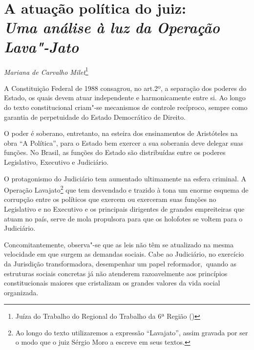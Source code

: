 \chapter*{A atuação política do juiz:\\
\emph{Uma análise à luz da Operação Lava"-Jato}}


\begin{flushright}
\emph{Mariana de Carvalho Milet}\footnote{Juíza do Trabalho do Regional do Trabalho da 6ª Região ()}
\end{flushright}




A Constituição Federal de 1988 consagrou, no art.2º, a separação dos
poderes do Estado, os quais devem atuar independente e harmonicamente
entre si. Ao longo do texto constitucional criam"-se mecanismos de
controle recíproco, sempre como garantia de perpetuidade do Estado
Democrático de Direito.

O poder é soberano, entretanto, na esteira dos ensinamentos de
Aristóteles na obra ``A Política'', para o Estado bem exercer a sua
soberania deve delegar suas funções. No Brasil, as funções do Estado são
distribuídas entre os poderes Legislativo, Executivo e Judiciário.

O protagonismo do Judiciário tem aumentado ultimamente na esfera
criminal. A Operação Lavajato\footnote{Ao longo do texto utilizaremos a
  expressão ``Lavajato'', assim gravada por ser o modo que o juiz Sérgio
  Moro a escreve em seus textos.} que tem desvendado e trazido à tona um
enorme esquema de corrupção entre os políticos que exercem ou exerceram
suas funções no Legislativo e no Executivo e os principais dirigentes de
grandes empreiteiras que atuam no país, serve de mola propulsora para
que os holofotes se voltem para o Judiciário.

Concomitantemente, observa"-se que as leis não têm se atualizado na mesma
velocidade em que surgem as demandas sociais. Cabe ao Judiciário, no
exercício da Jurisdição transformadora, desempenhar um papel
reformador,\textbf{~}quando as estruturas sociais concretas já não
atenderem razoavelmente aos princípios constitucionais maiores que
cristalizam os grandes valores da vida social organizada.

